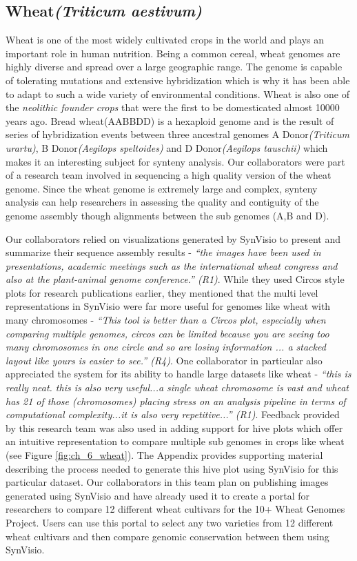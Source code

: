 \subsection{Wheat\textit{(Triticum aestivum)}}
Wheat is one of the most widely cultivated crops in the world and plays an important role in human nutrition. Being a common cereal, wheat genomes are highly diverse and spread over a large geographic range. The genome is capable of tolerating mutations and extensive hybridization which is why it has been able to adapt to such a wide variety of environmental conditions\cite{wheatinfo,10wheat}. Wheat is also one of the \textit{neolithic founder crops} that were the first to be domesticated almost 10000 years ago.
Bread wheat(AABBDD) is a hexaploid genome and is the result of series of hybridization events between three ancestral genomes A Donor\textit{(Triticum urartu)}, B Donor\textit{(Aegilops speltoides)} and D Donor\textit{(Aegilops tauschii)} which makes it an interesting subject for synteny analysis. Our collaborators were part of a research team involved in sequencing a high quality version of the wheat genome. Since the wheat genome is extremely large and complex, synteny analysis can help researchers in assessing the quality and contiguity of the genome assembly though alignments between the sub genomes (A,B and D).

Our collaborators relied on visualizations generated by SynVisio to present and summarize their sequence assembly results - \textit{``the images have been used in presentations, academic meetings such as the international wheat congress and also at the plant-animal genome conference.'' (R1)}. While they used Circos style plots for research publications earlier, they mentioned that the multi level representations in SynVisio were far more useful for genomes like wheat with many chromosomes - \textit{``This tool is better than a Circos plot, especially when comparing multiple genomes, circos can be limited because you are seeing too many chromosomes in one circle and so are losing information ... a stacked layout like yours is easier to see.'' (R4)}. One collaborator in particular also appreciated the system for its ability to handle large datasets like wheat - \textit{``this is really neat. this is also very useful...a single wheat chromosome is vast and wheat has 21 of those (chromosomes) placing stress on an analysis pipeline in terms of computational complexity...it is also very repetitive...'' (R1)}.
Feedback provided by this research team was also used in adding support for hive plots which offer an intuitive representation to compare multiple sub genomes in crops like wheat (see Figure \ref{fig:ch_6_wheat}). The Appendix provides supporting material describing the process needed to generate this hive plot using SynVisio for this particular dataset. Our collaborators in this team plan on publishing images generated using SynVisio and have already used it to create a portal for researchers to compare 12 different wheat cultivars for the 10+ Wheat Genomes Project. Users can use this portal to select any two varieties from 12 different wheat cultivars and then compare genomic conservation between them using SynVisio\cite{10wheat,wheatinfogithub}.


